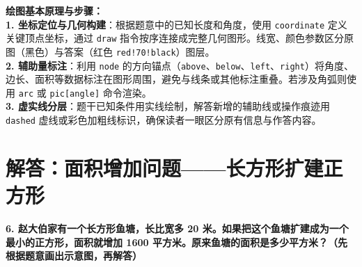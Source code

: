 \vspace{0.6cm}

{\small\color{blue!70!black}
\textbf{绘图基本原理与步骤：}\\
\textbf{1. 坐标定位与几何构建}：根据题意中的已知长度和角度，使用 \texttt{coordinate} 定义关键顶点坐标，通过 \texttt{draw} 指令按序连接成完整几何图形。线宽、颜色参数区分原图（黑色）与答案（红色 \texttt{red!70!black}）图层。\\
\textbf{2. 辅助量标注}：利用 \texttt{node} 的方向锚点（\texttt{above}、\texttt{below}、\texttt{left}、\texttt{right}）将角度、边长、面积等数据标注在图形周围，避免与线条或其他标注重叠。若涉及角弧则使用 \texttt{arc} 或 \texttt{pic[angle]} 命令渲染。\\
\textbf{3. 虚实线分层}：题干已知条件用实线绘制，解答新增的辅助线或操作痕迹用 \texttt{dashed} 虚线或彩色加粗线标识，确保读者一眼区分原有信息与作答内容。
}

\newpage



\section{解答：面积增加问题——长方形扩建正方形}

\vspace{0.4cm}

\noindent\textbf{6. 赵大伯家有一个长方形鱼塘，长比宽多 20 米。如果把这个鱼塘扩建成为一个最小的正方形，面积就增加 1600 平方米。原来鱼塘的面积是多少平方米？（先根据题意画出示意图，再解答）}

\vspace{0.8cm}

\begin{center}
\end{center}

